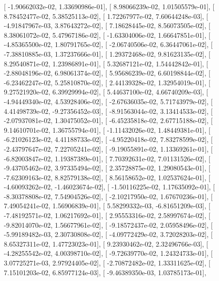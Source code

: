 \documentclass{article}
\begin{document}
       [ -1.90662032e-02,   1.33690986e-01],
       [  8.98066239e-02,   1.01505579e-01],
       [  8.78452477e-02,   5.38525113e-02],
       [  1.72267977e-02,   7.60644248e-03],
       [ -4.91847967e-03,   3.87643272e-02],
       [  7.18628445e-02,   8.56073505e-02],
       [  8.38061072e-02,   5.47967186e-02],
       [ -1.63304006e-02,   1.66647851e-01],
       [ -4.85365500e-02,   1.80791765e-02],
       [ -2.06740506e-02,   6.36447061e-02],
       [ -7.38810885e-03,   1.37237666e-01],
       [  1.29372468e-02,   9.81623135e-02],
       [  8.29540871e-02,   1.23986891e-01],
       [  5.32687121e-02,   1.54442842e-01],
       [ -2.88048196e-02,   6.98061374e-02],
       [  5.95686239e-02,   6.60198844e-02],
       [ -6.23462247e-02,   5.25810870e-02],
       [  2.44139328e-02,   1.32954019e-01],
       [  9.27521920e-02,   6.39929994e-02],
       [  5.44637100e-02,   4.66740209e-03],
       [ -4.94449340e-02,   4.53928406e-02],
       [ -2.67636035e-02,   5.71743979e-02],
       [  4.41498739e-02,  -9.27356452e-03],
       [ -8.91563044e-02,   3.13414533e-02],
       [ -2.07937081e-02,   1.30475052e-01],
       [ -6.45235818e-02,   2.67715188e-02],
       [  9.14610701e-02,   1.36755794e-01],
       [ -1.11432026e-02,   1.48449381e-01],
       [ -6.21026123e-02,   4.41188733e-02],
       [ -4.95220418e-02,   7.83278599e-02],
       [ -2.43797647e-02,   7.22705241e-02],
       [ -9.19055891e-02,   1.13369261e-01],
       [ -6.82003847e-02,   1.19387389e-01],
       [  7.70392631e-02,   7.01131526e-02],
       [ -9.43705462e-02,   3.97335494e-02],
       [  2.35728875e-02,   1.29080543e-01],
       [ -7.62309163e-02,   8.82579138e-02],
       [  8.56158652e-02,   1.02537624e-01],
       [ -4.60093262e-02,  -1.46023674e-02],
       [ -1.50116225e-02,   1.17635092e-01],
       [ -8.30378808e-02,   7.54904526e-02],
       [ -2.10217950e-02,   1.67670236e-01],
       [  7.49054241e-02,   1.56906839e-01],
       [  5.58299332e-03,  -6.81651209e-03],
       [ -7.48192571e-02,   1.06217692e-01],
       [  2.95553316e-02,   2.58997674e-02],
       [ -9.82014070e-02,   1.56677961e-02],
       [ -9.18572437e-02,   2.05958496e-02],
       [ -5.99189482e-03,   2.30730808e-02],
       [ -4.09772429e-02,   3.72028203e-02],
       [  8.65327311e-02,   1.47723023e-01],
       [  9.23930462e-02,   2.32496766e-03],
       [ -4.28255542e-02,   4.00398710e-02],
       [ -9.72639770e-02,   1.24324733e-01],
       [  3.07725271e-03,   2.97924405e-02],
       [ -2.70872482e-02,   1.33311625e-02],
       [  7.15101203e-02,   6.85977124e-03],
       [ -9.46389350e-03,   1.03785173e-01],
\end{document}
